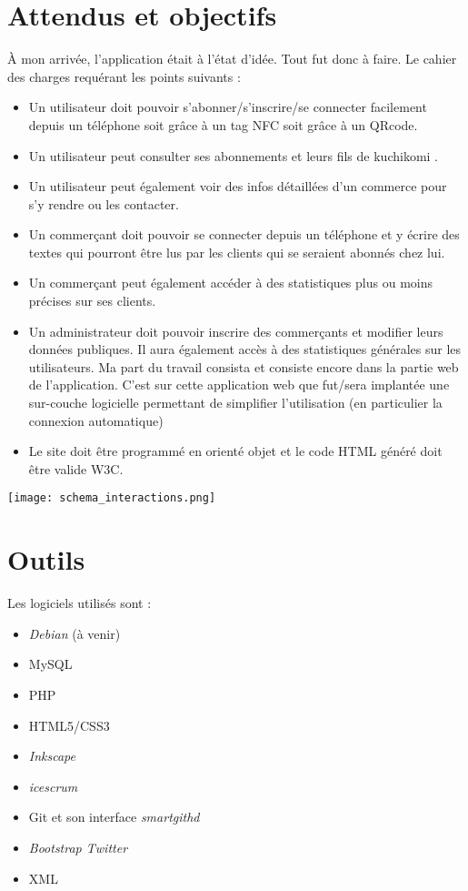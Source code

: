 \documentclass[a4paper,12pt,titlepage]{report}
\begin{document}
\section{Attendus et objectifs}

À mon arrivée, l'application était à l'état d'idée. Tout fut donc à faire. Le cahier des charges requérant les points suivants :

\begin{itemize}

\item Un utilisateur doit pouvoir s'abonner/s'inscrire/se connecter facilement depuis un téléphone soit grâce à un tag NFC soit grâce à un QRcode.
\item Un utilisateur peut consulter ses abonnements et leurs fils de \og kuchikomi \fg{} .
\item Un utilisateur peut également voir des infos détaillées d'un commerce pour s'y rendre ou les contacter.
\item Un commerçant doit pouvoir se connecter depuis un téléphone et y écrire des textes qui pourront être lus par les clients qui se seraient abonnés chez lui.
\item Un commerçant peut également accéder à des statistiques plus ou moins précises sur ses clients.
\item Un administrateur doit pouvoir inscrire des commerçants et modifier leurs données publiques. Il aura également accès à des statistiques générales sur les utilisateurs.
Ma part du travail consista et consiste encore dans la partie web de l'application. C'est sur cette application web que fut/sera implantée une sur-couche logicielle permettant de simplifier l'utilisation (en particulier la connexion automatique)
\item Le site doit être programmé en orienté objet et le code HTML généré doit être valide W3C. 

\end{itemize}

\texttt{[image: schema\_interactions.png]}



\section{Outils}

Les logiciels utilisés sont :

\begin{itemize}

\item \emph{Debian} (à venir)
\item MySQL 
\item PHP
\item HTML5/CSS3
\item \emph{Inkscape}
\item \emph{icescrum}
\item Git et son interface \emph{smartgithd}
\item \emph{Bootstrap Twitter}
\item XML

\end{itemize}
\end{document}
